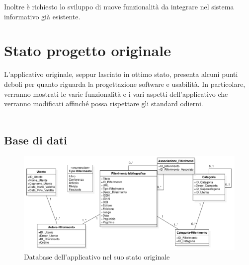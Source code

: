 Inoltre è richiesto lo sviluppo di nuove funzionalità da integrare nel sistema informativo già esistente.
\newpage
\raggedright{\section{Stato progetto originale}}
L'applicativo originale, seppur lasciato in ottimo stato, presenta alcuni punti deboli per quanto riguarda la progettazione software e usabilità. In particolare, verranno mostrati le varie funzionalità e i vari aspetti dell'applicativo che verranno modificati affinché possa rispettare gli standard odierni.
\\~\\
\raggedright{{\subsection{Base di dati}}}

\begin{figure}[H]
    \centering
    \includegraphics[width=.90\textwidth]{Immagini/VecchioProgetto/UML Basi di Dati pre ristrutturato.png} 
    \caption{Database dell'applicativo nel suo stato originale}
\end{figure}
        
